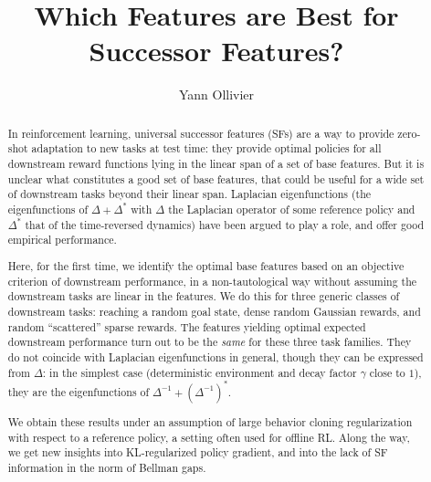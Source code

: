 \documentclass[11pt,a4paper]{article}
\title{Which Features are Best for Successor Features?}
\date{}
\author{Yann Ollivier}
\newcommand{\option}[1]{{\color[rgb]{.4,0,.8}[Optional:#1]}} %
\renewcommand{\option}[1]{}  %
\begin{document}
\maketitle

\begin{abstract}
In reinforcement learning, universal successor features (SFs) are a way to provide zero-shot adaptation to new tasks at test time: they provide optimal policies for all downstream reward functions lying in the linear span of a set of base features. But it is unclear what constitutes a good set of base features, that could be useful for a wide set of downstream tasks beyond their linear span. Laplacian eigenfunctions (the eigenfunctions of $\Delta+\Delta^\ast$ with $\Delta$ the Laplacian operator of some reference policy and $\Delta^\ast$ that of the time-reversed dynamics) have been argued to play a role, and offer good empirical performance.

Here, for the first time, we identify the optimal base features based on an objective criterion of downstream performance, in a non-tautological way without assuming the downstream tasks are linear in the features. We do this for three generic classes of downstream tasks: reaching a random goal state, dense random Gaussian rewards, and random ``scattered'' sparse rewards.  The features yielding optimal expected downstream performance turn out to be the \emph{same} for these three task families.  They do not coincide with Laplacian eigenfunctions in general, though they can be expressed from $\Delta$: in the simplest case (deterministic environment and decay factor $\gamma$ close to $1$), they are the eigenfunctions of $\Delta^{-1}+(\Delta^{-1})^\ast$.
% 

We obtain these results under an assumption of large behavior cloning regularization with respect to a reference policy, a setting often used for offline RL. Along the way, we get new insights into KL-regularized\option{natural} policy gradient, and into the lack of SF information in the norm of Bellman gaps.
\end{abstract}
\end{document}
